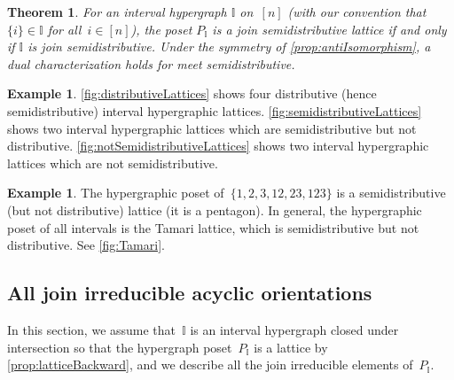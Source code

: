\documentclass{amsart}
\newtheorem{theoremA}{Theorem}
\theoremstyle{definition}
\newtheorem{example}[theorem]{Example}
\newtheorem{notation}[theorem]{Notation}
\newcommand{\cal}[1]{\mathcal{#1}} %
\newcommand{\bigset}[2]{\big\{ #1 \;|\; #2 \big\}} %
\newcommand{\ssm}{\smallsetminus} %
\newcommand{\eqdef}{\mbox{\,\raisebox{0.2ex}{\scriptsize\ensuremath{\mathrm:}}\ensuremath{=}\,}} %
\newcommand{\II}{\mathbb I} %
\newcommand{\cIJ}{\cal{IJ}} %
\begin{document}
\begin{theoremA}
For an interval hypergraph $\II$ on~$[n]$ (with our convention that~$\{i\} \in \II$ for all~$i \in [n]$), the poset $P_\II$ is a join semidistributive lattice if and only if $\II$ is join semidistributive.
Under the symmetry of \cref{prop:antiIsomorphism}, a dual characterization holds for meet semidistributive.
\end{theoremA}

\begin{example}
\cref{fig:distributiveLattices} shows four distributive (hence semidistributive) interval hypergraphic lattices.
%
\cref{fig:semidistributiveLattices} shows two interval hypergraphic lattices which are semidistributive but not distributive.
%
\cref{fig:notSemidistributiveLattices} shows two interval hypergraphic lattices which are not semidistributive.
\end{example}

\begin{example}
The hypergraphic poset of~$\{ 1, 2, 3, 12, 23, 123 \}$ is a semidistributive (but not distributive) lattice (it is a pentagon).
In general, the hypergraphic poset of all intervals is the Tamari lattice, which is semidistributive but not distributive.
See \cref{fig:Tamari}.
\end{example}


\subsection{All join irreducible acyclic orientations}
\label{subsec:joinIrreducibles}

In this section, we assume that~$\II$ is an interval hypergraph closed under intersection so that the hypergraph poset~$P_\II$ is a lattice  by \cref{prop:latticeBackward}, and we describe all the join irreducible elements of~$P_\II$. %

%
\end{document}
